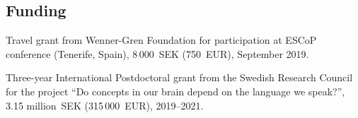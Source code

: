 \documentclass[margin, 11pt]{res} %
\begin{document}
\begin{resume}
%
%
%
%
%
%
%




\section{\sc Funding}


Travel grant from Wenner-Gren Foundation for participation at ESCoP conference (Tenerife, Spain), 8\,000~SEK (750~EUR), September 2019.

Three-year International Postdoctoral grant from the Swedish Research Council for the project ``Do concepts in our brain depend on the language we speak?'', 3.15 million~SEK (315\,000~EUR), 2019--2021.


\end{resume}
\end{document}
